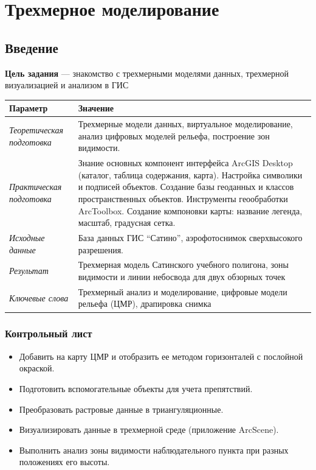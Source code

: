 \documentclass[]{book}
\providecommand{\tightlist}{%
  \setlength{\itemsep}{0pt}\setlength{\parskip}{0pt}}
\theoremstyle{definition}
\theoremstyle{definition}
\theoremstyle{definition}
\theoremstyle{remark}
\begin{document}
\hypertarget{threed-modelling}{%
\chapter{Трехмерное моделирование}\label{threed-modelling}}

\hypertarget{threed-modelling-intro}{%
\section{Введение}\label{threed-modelling-intro}}

\textbf{Цель задания} --- знакомство с трехмерными моделями данных,
трехмерной визуализацией и анализом в ГИС

\begin{longtable}[]{@{}ll@{}}
\toprule
Параметр & Значение\tabularnewline
\midrule
\endhead
\emph{Теоретическая подготовка} & Трехмерные модели данных, виртуальное
моделирование, анализ цифровых моделей рельефа, построение зон
видимости.\tabularnewline
\emph{Практическая подготовка} & Знание основных компонент интерфейса
ArcGIS Desktop (каталог, таблица содержания, карта). Настройка символики
и подписей объектов. Создание базы геоданных и классов пространственных
объектов. Инструменты геообработки ArcToolbox. Создание компоновки
карты: название легенда, масштаб, градусная сетка.\tabularnewline
\emph{Исходные данные} & База данных ГИС ``Сатино'', аэрофотоснимок
сверхвысокого разрешения.\tabularnewline
\emph{Результат} & Трехмерная модель Сатинского учебного полигона, зоны
видимости и линии небосвода для двух обзорных точек\tabularnewline
\emph{Ключевые слова} & Трехмерный анализ и моделирование, цифровые
модели рельефа (ЦМР), драпировка снимка\tabularnewline
\bottomrule
\end{longtable}

\hypertarget{threed-modelling-control}{%
\subsection{Контрольный лист}\label{threed-modelling-control}}

\begin{itemize}
\tightlist
\item
  Добавить на карту ЦМР и отобразить ее методом горизонталей с послойной
  окраской.
\item
  Подготовить вспомогательные объекты для учета препятствий.
\item
  Преобразовать растровые данные в триангуляционные.
\item
  Визуализировать данные в трехмерной среде (приложение ArcScene).
\item
  Выполнить анализ зоны видимости наблюдательного пункта при разных
  положениях его высоты.
\end{itemize}
\end{document}
